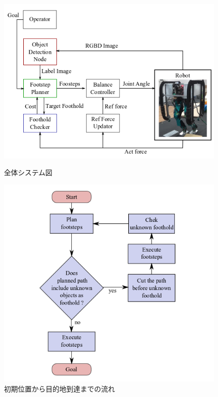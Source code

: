 \documentclass[twocolumn]{preport}
\begin{document}
\begin{figure}[tbh]
  \begin{center}
    \begin{minipage}{0.63\columnwidth}
      \includegraphics[width=0.95\columnwidth]{system.png}
      \caption{全体システム図}
      \label{system}
    \end{minipage}
    \begin{minipage}{0.35\columnwidth}
      \includegraphics[width=0.95\columnwidth]{flowchart.png}
      \caption{初期位置から目的地到達までの流れ}
      \label{flowchart}
    \end{minipage}
  \end{center}
\end{figure}
\end{document}

